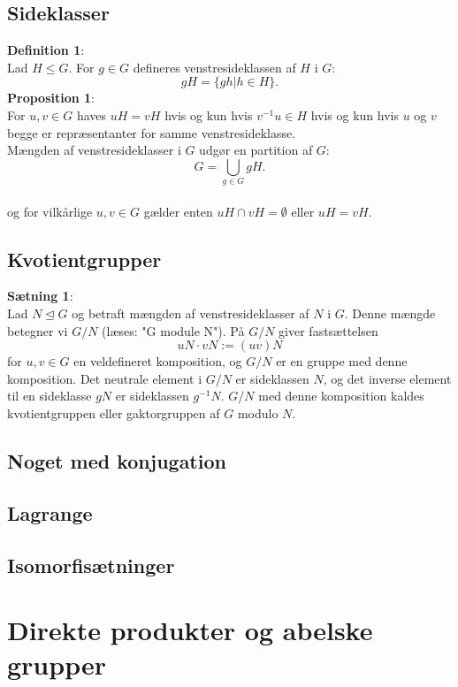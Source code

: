 \documentclass[11pt]{article}
\begin{document}
\subsection*{Sideklasser}
\textbf{Definition 1}:\\
Lad $H \leq G$. For $g \in G$ defineres venstresideklassen af $H$ i $G$:\\
$$gH = \{ gh | h \in H \}.$$
\textbf{Proposition 1}:\\
For $u, v \in G$ haves $uH = vH$ hvis og kun hvis $v^{-1} u \in H$ hvis og kun hvis $u$ og $v$ begge er repræsentanter for samme venstresideklasse.\\
Mængden af venstresideklasser i $G$ udgør en partition af $G$:\\
$$G = \bigcup_{g \in G} gH.$$\\
og for vilkårlige $u, v \in G$ gælder enten $uH \cap vH = \emptyset$ eller $uH = vH$.
\subsection*{Kvotientgrupper}
\textbf{Sætning 1}:\\
Lad $N \trianglelefteq G$ og betraft mængden af venstresideklasser af $N$ i $G$. Denne mængde betegner vi $G / N$ (læses: "G module N"). På $G / N$ giver fastsættelsen
$$uN \cdot vN := (uv)N$$
for $u, v \in G$ en veldefineret komposition, og $G / N$ er en gruppe med denne komposition. Det neutrale element i $G / N$ er sideklassen $N$, og det inverse element til en sideklasse $gN$ er sideklassen $g^{-1} N$. $G / N$ med denne komposition kaldes kvotientgruppen eller gaktorgruppen af $G$ modulo $N$.\\

\subsection*{Noget med konjugation}

\subsection*{Lagrange}

\subsection*{Isomorfisætninger}

\section*{Direkte produkter og abelske grupper}
\end{document}
